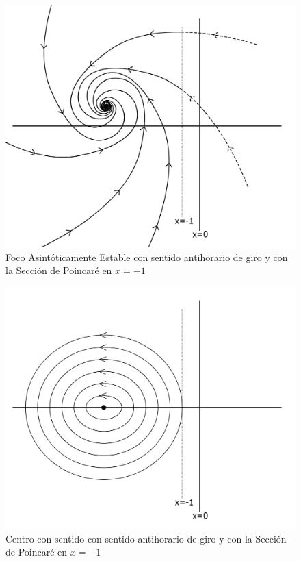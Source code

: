 \documentclass[12pt,a4paper]{report} %
\begin{document}
	\begin{figure}[h]
		\centering
		\includegraphics[width=1\textwidth]{foco3.jpg}
		\caption{Foco Asintóticamente Estable con sentido antihorario de giro y con la Sección de Poincaré en $x=-1$}
		\label{fig:foco3}
	\end{figure}\smallskip
	
	\newpage
	
	\begin{figure}[h]
		\centering
		\includegraphics[width=1\textwidth]{centro2.jpg}
		\caption{Centro con sentido con sentido antihorario de giro y con la Sección de Poincaré en $x=-1$}
		\label{fig:centro2}
	\end{figure}\smallskip
	
\end{document}
